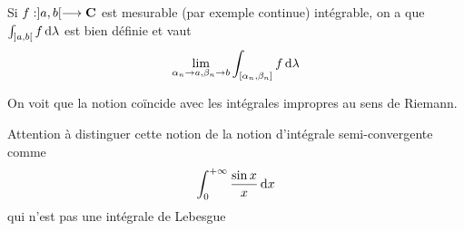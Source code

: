 \begin{rem}
    Si $f:]a, b[ \longrightarrow \mathbf C$ est mesurable (par exemple continue) intégrable, on a que $\int_{]a, b[}f\mathop{}\!\mathrm d\lambda$ est bien définie et vaut \[
        \lim_{\substack{\alpha_n\to a,\beta_n\to b}}\int_{[\alpha_n, \beta_n]}f\mathop{}\!\mathrm d\lambda
    \]
\end{rem}

On voit que la notion coïncide avec les intégrales impropres au sens de Riemann.

 \begin{rem}
Attention à distinguer cette notion de la notion d'intégrale semi-convergente comme \[
    \int_0^{+\infty} \frac{\sin x}{x}\mathop{}\!\mathrm d x
\] 
qui n'est pas une intégrale de Lebesgue\footnotemark
\end{rem}


